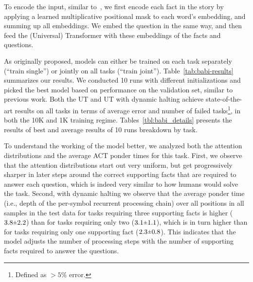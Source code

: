 To encode the input, similar to~\cite{henaff2016tracking}, we first encode each fact in the story by applying a learned multiplicative positional mask to each word's embedding, and summing up all embeddings.
We embed the question in the same way, and then feed the (Universal) Transformer with these embeddings of the facts and questions. 

As originally proposed, models can either be trained on each task separately (``train single'') or jointly on all tasks (``train joint''). Table~\ref{tab:babi-results} summarizes our results. We conducted 10 runs with different initializations and picked the best model based on performance on the validation set, similar to previous work. Both the UT and UT with dynamic halting achieve state-of-the-art results on all tasks in terms of average error and number of failed tasks\footnote{Defined as $> 5\%$ error.}, in both the 10K and 1K training regime. Tables~\ref{tbl:babi_details} presents the results of best and average results of 10 runs breakdown by task.





To understand the working of the model better, we analyzed both the attention distributions and the average ACT ponder times for this task. First, we observe that the attention distributions start out very uniform, but get progressively sharper in later steps around the correct supporting facts that are required to answer each question, which is indeed very similar to how humans would solve the task. 
%
Second, with dynamic halting we observe that the average ponder time (i.e., depth of the per-symbol recurrent processing chain) over all positions in all samples in the test data for tasks requiring three supporting facts is higher ($3.8 \rpm 2.2$) than for tasks requiring only two ($3.1 \rpm 1.1$), which is in turn higher than for tasks requiring only one supporting fact ($2.3 \rpm 0.8$). This indicates that the model adjusts the number of processing steps with the number of supporting facts required to answer the questions. 

